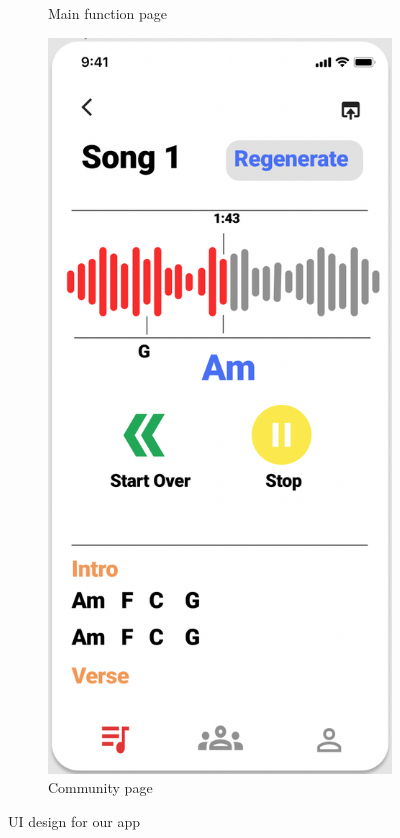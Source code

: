 \begin{figure}[ht]
\begin{subfigure}[b]{0.2\textwidth}
         \caption{Main function page}
         \label{Main function page}
     \end{subfigure}
     \hfill
     \begin{subfigure}[b]{0.2\textwidth}
         \centering
         \includegraphics[width=\textwidth]{Figures/grappp}
         \caption{Community page}
         \label{Community page}
     \end{subfigure}
     \hspace{16mm}
        \caption{UI design for our app}
        \label{fig:three graphs}
\end{figure}

